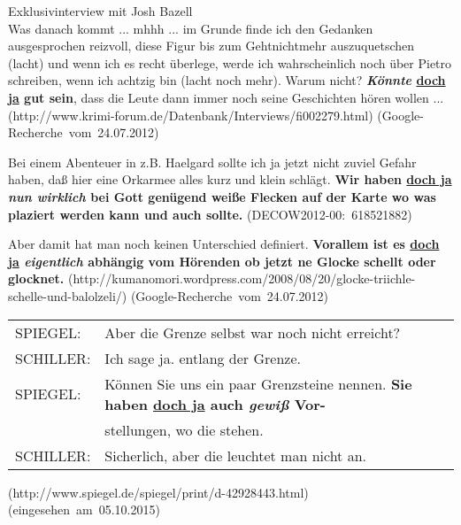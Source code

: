 \begin{exe}
	\ex\label{478} 
	\scriptsize
	Exklusivinterview mit Josh Bazell\\
	Was danach kommt ... mhhh ... im Grunde finde ich den Gedanken ausgesprochen reizvoll, diese Figur bis zum Gehtnichtmehr auszuquetschen (lacht) und 		wenn ich es recht überlege, werde ich wahrscheinlich noch über Pietro schreiben, wenn ich achtzig bin (lacht noch mehr). Warum nicht? \textbf{\textit{Könnte} \underline{doch ja} gut sein}, dass die Leute dann immer noch seine Geschichten hören wollen ...			
	\newline		
	\hbox{}\hfill\hbox{(http://www.krimi-forum.de/Datenbank/Interviews/fi002279.html)}	
	\newline		
	\hbox{}\hfill\hbox{(Google-Recherche vom 24.07.2012)}	
\end{exe} 

\begin{exe}
	\ex\label{479} 
	\scriptsize
	Bei einem Abenteuer in z.B. Haelgard sollte ich ja jetzt nicht zuviel Gefahr haben, daß hier eine Orkarmee alles kurz und klein schlägt. \textbf{Wir 		haben \underline{doch ja} \textit{nun wirklich} bei Gott genügend weiße Flecken auf der Karte wo was plaziert werden kann und auch sollte.} 		
	\hfill\hbox{(DECOW2012-00: 618521882)}	
	\newline		
	\hbox{}\hfill\hbox{\citet[228]{Mueller2017b}}	
\end{exe} 		      

\begin{exe}
	\ex\label{480} 
	\scriptsize
	Aber damit hat man noch keinen Unterschied definiert. \textbf{Vorallem ist es \underline{doch ja} \textit{eigentlich} abhängig vom Hörenden ob jetzt ne Glocke schellt oder glocknet.}
	\newline
	\hbox{}\hfill\hbox{(http://kumanomori.wordpress.com/2008/08/20/glocke-triichle-schelle-und-balolzeli/)}	
	\newline		
	\hbox{}\hfill\hbox{(Google-Recherche vom 24.07.2012)}	
	\newline		
	\hbox{}\hfill\hbox{\citet[201]{Mueller2014a}}	
\end{exe} 	
\vspace{-0.65cm}
\begin{exe}
\ex\label{481}
\scriptsize
\begin{tabular}[t]{ll}
	SPIEGEL: & Aber die Grenze selbst war noch nicht erreicht? \tabularnewline
	SCHILLER: & Ich sage ja. entlang der Grenze. \tabularnewline 
	SPIEGEL: &	Können Sie uns ein paar Grenzsteine nennen. \textbf{Sie haben \underline{doch ja} auch \textit{gewiß} Vor-} \tabularnewline
	& stellungen, wo die stehen. \tabularnewline
	SCHILLER: & Sicherlich, aber die leuchtet man nicht an. 
\end{tabular}
	\newline		
	\hbox{}\hfill\hbox{(http://www.spiegel.de/spiegel/print/d-42928443.html)}
	\newline		
	\hbox{}\hfill\hbox{(eingesehen am 05.10.2015)}
\end{exe}

